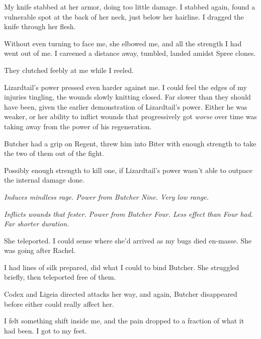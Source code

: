 My knife stabbed at her armor, doing too little damage.  I stabbed again, found a vulnerable spot at the back of her neck, just below her hairline.  I dragged the knife through her flesh.



Without even turning to face me, she elbowed me, and all the strength I had went out of me.  I careened a distance away, tumbled, landed amidst Spree clones.



They clutched feebly at me while I reeled.



Lizardtail's power pressed even harder against me.  I could feel the edges of my injuries tingling, the wounds slowly knitting closed.  Far slower than they should have been, given the earlier demonstration of Lizardtail's power.  Either he was weaker, or her ability to inflict wounds that progressively got \emph{worse} over time was taking away from the power of his regeneration.



Butcher had a grip on Regent, threw him into Biter with enough strength to take the two of them out of the fight.



Possibly enough strength to kill one, if Lizardtail's power wasn't able to outpace the internal damage done.



\emph{Induces mindless rage.  Power from Butcher Nine.  Very low range.}



\emph{Inflicts wounds that fester.  Power from Butcher Four.  Less effect than Four had.  Far shorter duration.}



She teleported.  I could sense where she'd arrived as my bugs died en-masse.  She was going after Rachel.



I had lines of silk prepared, did what I could to bind Butcher.  She struggled briefly, then teleported free of them.



Codex and Ligeia directed attacks her way, and again, Butcher disappeared before either could really affect her.



I felt something shift inside me, and the pain dropped to a fraction of what it had been.  I got to my feet.



